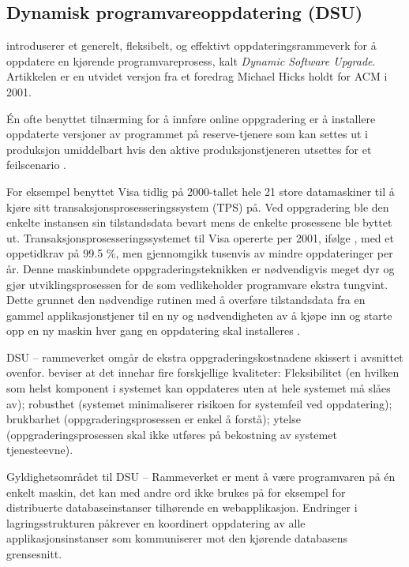 \subsection{Dynamisk programvareoppdatering (DSU)}

\cite{hicks2005dsu} introduserer et generelt, fleksibelt, og effektivt oppdateringsrammeverk for å oppdatere en kjørende programvareprosess, kalt \emph{Dynamic Software Upgrade}. Artikkelen er en utvidet versjon fra et foredrag Michael Hicks holdt for ACM i 2001.

Én ofte benyttet tilnærming for å innføre online oppgradering er å installere oppdaterte versjoner av programmet på reserve-tjenere som kan settes ut i produksjon umiddelbart hvis den aktive produksjonstjeneren utsettes for et feilscenario \citep{hicks2005dsu}.

For eksempel benyttet Visa tidlig på 2000-tallet hele 21 store datamaskiner til å kjøre sitt transaksjonsprosesseringssystem (TPS) på. Ved oppgradering ble den enkelte instansen sin tilstandsdata bevart mens de enkelte prosessene ble byttet ut. Transaksjonsprosesseringssystemet til Visa opererte per 2001, ifølge \cite{hicks2005dsu}, med et oppetidkrav på 99.5 \%, men gjennomgikk tusenvis av mindre oppdateringer per år. Denne maskinbundete oppgraderingsteknikken er nødvendigvis meget dyr og gjør utviklingsprosessen for de som vedlikeholder programvare ekstra tungvint. Dette grunnet den nødvendige rutinen med å overføre tilstandsdata fra en gammel applikasjonstjener til en ny og nødvendigheten av å kjøpe inn og starte opp en ny maskin hver gang en oppdatering skal installeres \citep{hicks2005dsu}.

DSU – rammeverket omgår de ekstra oppgraderingskostnadene skissert i avsnittet ovenfor. \cite{hicks2005dsu} beviser at det innehar fire forskjellige kvaliteter: Fleksibilitet (en hvilken som helst komponent i systemet kan oppdateres uten at hele systemet må slåes av); robusthet (systemet minimaliserer risikoen for systemfeil ved oppdatering); brukbarhet (oppgraderingsprosessen er enkel å forstå); ytelse (oppgraderingsprosessen skal ikke utføres på bekostning av systemet tjenesteevne).

Gyldighetsområdet til DSU – Rammeverket er ment å være programvaren på én enkelt maskin, det kan med andre ord ikke brukes på for eksempel for distribuerte databaseinstanser tilhørende en webapplikasjon. Endringer i lagringsstrukturen påkrever en koordinert oppdatering av alle applikasjonsinstanser som kommuniserer mot den kjørende databasens grensesnitt.

